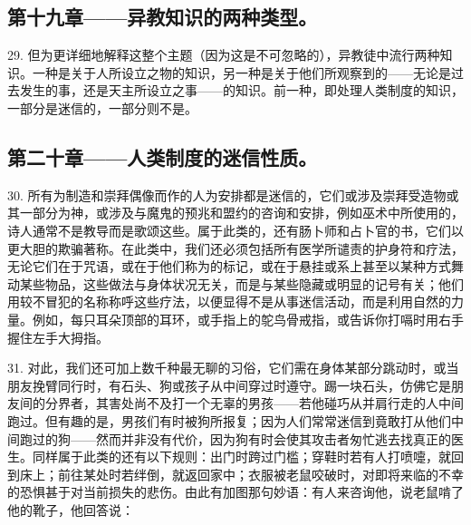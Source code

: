 
\subsection{第十九章——异教知识的两种类型。}

29. 但为更详细地解释这整个主题（因为这是不可忽略的），异教徒中流行两种知识。一种是关于人所设立之物的知识，另一种是关于他们所观察到的——无论是过去发生的事，还是天主所设立之事——的知识。前一种，即处理人类制度的知识，一部分是迷信的，一部分则不是。\par


\subsection{第二十章——人类制度的迷信性质。}

30. 所有为制造和崇拜偶像而作的人为安排都是迷信的，它们或涉及崇拜受造物或其一部分为神，或涉及与魔鬼的预兆和盟约的咨询和安排，例如巫术中所使用的，诗人通常不是教导而是歌颂这些。属于此类的，还有肠卜师和占卜官的书，它们以更大胆的欺骗著称。在此类中，我们还必须包括所有医学所谴责的护身符和疗法，无论它们在于咒语，或在于他们称为的标记，或在于悬挂或系上甚至以某种方式舞动某些物品，这些做法与身体状况无关，而是与某些隐藏或明显的记号有关；他们用较不冒犯的名称称呼这些疗法，以便显得不是从事迷信活动，而是利用自然的力量。例如，每只耳朵顶部的耳环，或手指上的鸵鸟骨戒指，或告诉你打嗝时用右手握住左手大拇指。\par

31. 对此，我们还可加上数千种最无聊的习俗，它们需在身体某部分跳动时，或当朋友挽臂同行时，有石头、狗或孩子从中间穿过时遵守。踢一块石头，仿佛它是朋友间的分界者，其害处尚不及打一个无辜的男孩——若他碰巧从并肩行走的人中间跑过。但有趣的是，男孩们有时被狗所报复；因为人们常常迷信到竟敢打从他们中间跑过的狗——然而并非没有代价，因为狗有时会使其攻击者匆忙逃去找真正的医生。同样属于此类的还有以下规则：出门时跨过门槛；穿鞋时若有人打喷嚏，就回到床上；前往某处时若绊倒，就返回家中；衣服被老鼠咬破时，对即将来临的不幸的恐惧甚于对当前损失的悲伤。由此有加图那句妙语：有人来咨询他，说老鼠啃了他的靴子，他回答说：\par


